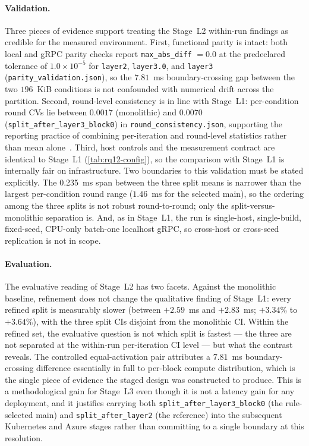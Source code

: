 \paragraph{Validation.}
Three pieces of evidence support treating the Stage~L2 within-run findings as
credible for the measured environment. First, functional parity is intact:
both local and gRPC parity checks report
\texttt{max\_abs\_diff} \(=0.0\) at the predeclared tolerance of
\(1.0\times10^{-5}\) for \texttt{layer2}, \texttt{layer3.0}, and
\texttt{layer3} (\texttt{parity\_validation.json}), so the \(7.81\)~ms
boundary-crossing gap between the two \(196\)~KiB conditions is not
confounded with numerical drift across the partition. Second, round-level
consistency is in line with Stage~L1: per-condition round CVs lie between
\(0.0017\) (monolithic) and \(0.0070\)
(\texttt{split\_after\_layer3\_block0}) in
\texttt{round\_consistency.json}, supporting the reporting practice of
combining per-iteration and round-level statistics rather than mean
alone~\cite{benchmarking_sc15}. Third, host controls and the measurement
contract are identical to Stage~L1 (\cref{tab:rq12-config}), so the comparison
with Stage~L1 is internally fair on infrastructure. Two boundaries to this
validation must be stated explicitly. The 0.235~ms span between the three
split means is narrower than the largest per-condition round range
(\(1.46\)~ms for the selected main), so the ordering among the three splits
is not robust round-to-round; only the split-versus-monolithic separation
is. And, as in Stage~L1, the run is single-host, single-build, fixed-seed,
CPU-only batch-one localhost gRPC, so cross-host or cross-seed replication
is not in scope.

\paragraph{Evaluation.}
The evaluative reading of Stage~L2 has two facets. Against the monolithic
baseline, refinement does not change the qualitative finding of Stage~L1:
every refined split is measurably slower (between \(+2.59\)~ms and
\(+2.83\)~ms; \(+3.34\%\) to \(+3.64\%\)), with the three split CIs
disjoint from the monolithic CI. Within the refined set, the evaluative
question is not which split is fastest --- the three are not separated at
the within-run per-iteration CI level --- but what the contrast reveals.
The controlled equal-activation pair attributes a \(7.81\)~ms
boundary-crossing difference essentially in full to per-block compute
distribution, which is the single piece of evidence the staged design was
constructed to produce. This is a methodological gain for Stage~L3 even
though it is not a latency gain for any deployment, and it justifies
carrying both \texttt{split\_after\_layer3\_block0} (the rule-selected
main) and \texttt{split\_after\_layer2} (the reference) into the
subsequent Kubernetes and Azure stages rather than committing to a single
boundary at this resolution.

